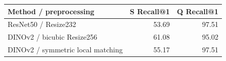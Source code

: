 \begin{tabular}{lrr}
\toprule
Method / preprocessing & S Recall@1 & Q Recall@1 \\
\midrule
ResNet50 / Resize232 & 53.69 & 97.51 \\
DINOv2 / bicubic Resize256 & 61.08 & 95.02 \\
DINOv2 / symmetric local matching & 55.17 & 97.51 \\
\bottomrule
\end{tabular}
